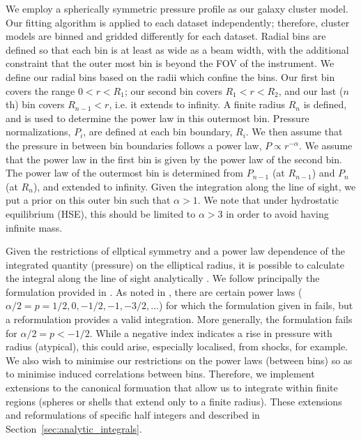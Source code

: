 \documentclass[twocolumn,traditabstract]{aa}
\begin{document}
We employ a spherically symmetric pressure profile as our galaxy cluster model. Our fitting algorithm is applied
to each dataset independently; therefore, cluster models are binned and gridded differently for each dataset.
Radial bins are defined so that
each bin is at least as wide as a beam width, with the additional constraint that the outer most bin is beyond
the FOV of the instrument. We define our radial bins based on the radii which confine the bins. Our first bin
covers the range $0 < r < R_1$; our second bin covers $R_1 < r < R_2$, and our last ($n$th) bin covers
$R_{n-1} < r $, i.e. it extends to infinity. A finite radius $R_n$ is defined, and is used to determine the power
law in this outermost bin. Pressure normalizations, $P_i$, are defined at each bin boundary, $R_i$. We then assume
that the pressure in between bin boundaries follows a power law, $P \propto r^{-\alpha}$. We assume that the power
law in the first bin is given by the power law of the second bin.
The power law of the outermost bin is determined from $P_{n-1}$ (at $R_{n-1}$) and $P_{n}$ (at $R_{n}$), and extended
to infinity. Given the integration along the line of sight, we put a prior on this outer bin such that $\alpha > 1$.
We note that under hydrostatic equilibrium (HSE), this should be limited to $\alpha >3$ in order to avoid having
infinite mass.

Given the restrictions of ellptical symmetry and a power law dependence of the integrated quantity (pressure) on the
elliptical radius, it is possible to calculate the integral along the line of sight analytically
\citep[e.g.][]{vikhlinin2001a,korngut2011}. We follow
principally the formulation provided in \citet{korngut2011}. As noted in \citet{sarazin2016}, there are certain power
laws ($\alpha/2 = p = 1/2, 0 , -1/2, -1, -3/2, ...$) for which the formulation given in \citet{korngut2011} fails,
but a reformulation provides a valid integration. More generally, the formulation fails for $\alpha/2 = p < -1/2$.
While a negative index indicates a rise in pressure with radius (atypical), this could arise, especially localised,
from shocks, for example. We also wish to minimise our restrictions on the power laws (between bins) so as to minimise
induced correlations between bins. Therefore, we implement extensions to the canonical formuation that allow us to
integrate within finite regions (spheres or shells that extend only to a finite radius). These extensions and
reformulations of specific half integers and described in Section~\ref{sec:analytic_integrals}.
\end{document}

